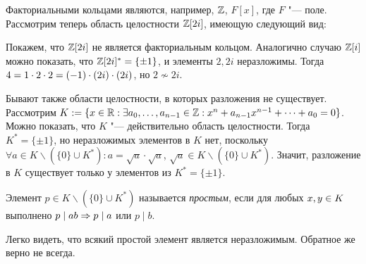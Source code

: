 \begin{example}
	Факториальными кольцами являются, например, $\mathbb{Z}$, $F[x]$, где $F$ "--- поле. Рассмотрим теперь область целостности $\mathbb{Z}[2i]$, имеющую следующий вид:
	\begin{center}
	\end{center}
	
	Покажем, что $\mathbb{Z}[2i]$ не является факториальным кольцом. Аналогично случаю $\mathbb{Z}[i]$ можно показать, что $\mathbb{Z}[2i]^* = \{\pm1\}$, и элементы $2, 2i$ неразложимы. Тогда $4 = 1 \cdot 2 \cdot 2 \hm= (-1)\cdot (2i) \cdot (2i)$, но $2 \not\sim 2i$.
\end{example}

\begin{note}
	Бывают также области целостности, в которых разложения не существует. Рассмотрим $K := \{x \in \mathbb{R}: \exists a_0, \dotsc, a_{n - 1} \in \mathbb{Z}: x^n + a_{n-1}x^{n-1} + \dotsb + a_0 = 0\}$. Можно показать, что $K$ "--- действительно область целостности. Тогда $K^* = \{\pm1\}$, но неразложимых элементов в $K$ нет, поскольку $\forall a \in K \backslash (\{0\} \cup K^*): a = \sqrt{a} \cdot \sqrt{a}$, $\sqrt{a} \in K \backslash (\{0\} \cup K^*)$. Значит, разложение в $K$ существует только у элементов из $K^* = \{\pm1\}$.
\end{note}

\begin{definition}
	Элемент $p \in K \backslash (\{0\} \cup K^*)$ называется \textit{простым}, если для любых $x, y \hm\in K$ выполнено $p \mid ab \Rightarrow p \mid a$ или $p \mid b$.
\end{definition}

\begin{note}
	Легко видеть, что всякий простой элемент является неразложимым. Обратное же верно не всегда.
\end{note}

